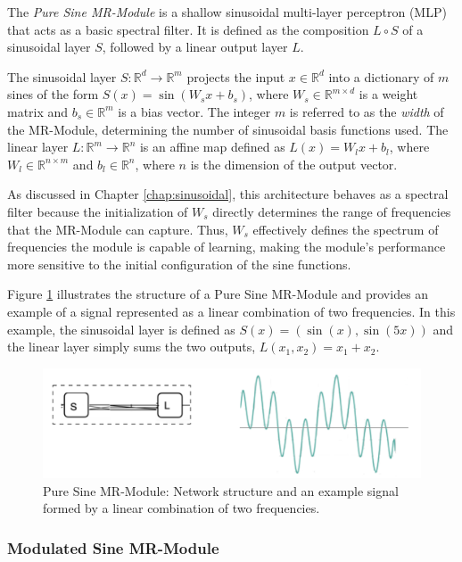 The \textit{Pure Sine MR-Module} is a shallow sinusoidal multi-layer perceptron (MLP) that acts as a basic spectral filter. It is defined as the composition \( L \circ S \) of a sinusoidal layer \( S \), followed by a linear output layer \( L \).

The sinusoidal layer \( S\!:\!\mathbb{R}^d\!\to\! \mathbb{R}^m \) projects the input \( x \in \mathbb{R}^d \) into a dictionary of \( m \) sines of the form \( S(x) = \sin\left(W_s x + b_s\right) \), where \( W_s \in \mathbb{R}^{m \times d} \) is a weight matrix and \( b_s \in \mathbb{R}^m \) is a bias vector. The integer \( m \) is referred to as the \textit{width} of the MR-Module, determining the number of sinusoidal basis functions used. The linear layer \( L\!:\!\mathbb{R}^m\!\to\! \mathbb{R}^n \) is an affine map defined as \( L(x) = W_l x + b_l \), where \( W_l \in \mathbb{R}^{n \times m} \) and \( b_l \in \mathbb{R}^n \), where $n$ is the dimension of the output vector.

As discussed in Chapter \ref{chap:sinusoidal}, this architecture behaves as a spectral filter because the initialization of \( W_s \) directly determines the range of frequencies that the MR-Module can capture. Thus, \( W_s \) effectively defines the spectrum of frequencies the module is capable of learning, making the module's performance more sensitive to the initial configuration of the sine functions.

Figure \ref{f:pure-sine} illustrates the structure of a Pure Sine MR-Module and provides an example of a signal represented as a linear combination of two frequencies. In this example, the sinusoidal layer is defined as \( S(x) = (\sin(x), \sin(5x)) \) and the linear layer simply sums the two outputs, \( L(x_1, x_2) = x_1 + x_2 \).

\begin{figure}[!h]
\centering
\includegraphics[width=0.8\linewidth]{img/ch4/pure-sine.png}
\caption{Pure Sine MR-Module: Network structure and an example signal formed by a linear combination of two frequencies.}
\label{f:pure-sine}
\end{figure}

\subsubsection{Modulated Sine MR-Module}


